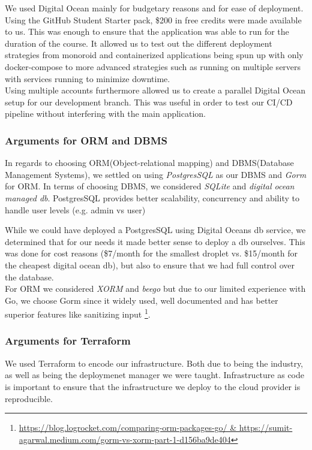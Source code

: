 We used Digital Ocean mainly for budgetary reasons and for ease of deployment. Using the GitHub Student 
Starter pack, \$200 in free credits were made available to us. This was enough to ensure that the application 
was able to run for the duration of the course. It allowed us to test out the different deployment strategies
from monoroid and containerized applications being spun up with only docker-compose to more advanced strategies such as
running on multiple servers with services running to minimize downtime.\\

Using multiple accounts furthermore allowed us to create a parallel Digital Ocean setup for our development branch.
This was useful in order to test our CI/CD pipeline without interfering with the main application.\\

\subsubsection{Arguments for ORM and DBMS}
In regards to choosing ORM(Object-relational mapping) and DBMS(Database Management Systems), we settled on 
using \textit{PostgresSQL} as our DBMS and \textit{Gorm} for ORM. In terms of choosing DBMS, we considered 
\textit{SQLite} and \textit{digital ocean managed db}. PostgresSQL provides better scalability, concurrency and ability
to handle user levels (e.g. admin vs user)

While we could have deployed a PostgresSQL using Digital Oceans db service, we determined that for our needs it made 
better sense to deploy a db ourselves. This was done for cost reasons (\$7/month for the smallest droplet vs. \$15/month 
for the cheapest digital ocean db), but also to ensure that we had full control over the database.\\

For ORM we considered \textit{XORM} and \textit{beego} but due to our limited experience with Go, we choose Gorm 
since it widely used, well documented and has better superior features like sanitizing input \footnote{\url{https://blog.logrocket.com/comparing-orm-packages-go/ & https://sumit-agarwal.medium.com/gorm-vs-xorm-part-1-d156ba9de404}}.

\subsubsection{Arguments for Terraform}
We used Terraform to encode our infrastructure. Both due to being the industry, as well as being the deploymenet manager we were taught.
Infrastructure as code is important to ensure that the infrastructure we deploy to the cloud provider is reproducible.

